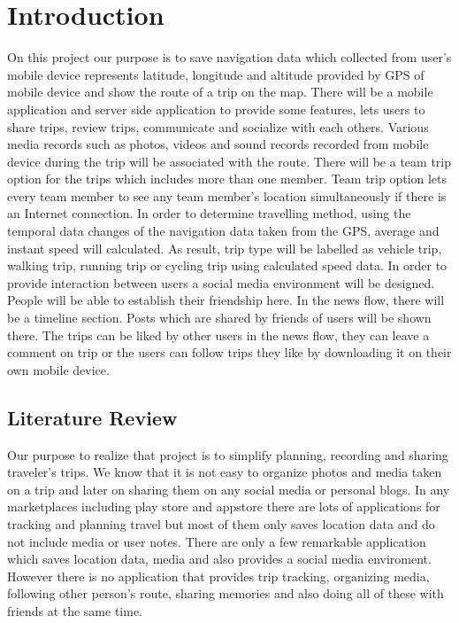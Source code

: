 \chapter{Introduction}
On this project our purpose is to save navigation data which collected from user's mobile device represents latitude, longitude and altitude provided by GPS of mobile device and show the route of a trip on the map. There will be a mobile application and server side application to provide some features, lets users to share trips, review trips, communicate and socialize with each others. Various media records such as photos, videos and sound records recorded from mobile device during the trip will be associated with the route. There will be a team trip option for the trips which includes more than one member. Team trip option lets every team member to see any team member's location simultaneously if there is an Internet connection. In order to determine travelling method, using the temporal data changes of the navigation data taken from the GPS, average and instant speed will calculated. As result, trip type will be labelled as vehicle trip, walking trip, running trip or cycling trip using calculated speed data. In order to provide interaction between users a social media environment will be designed. People will be able to establish their friendship here. In the news flow, there will be a timeline section. Posts which are shared by friends of users will be shown there. The trips can be liked by other users in the news flow, they can leave a comment on trip or the users can follow trips they like by downloading it on their own mobile device.
\section{Literature Review}
Our purpose to realize that project is to simplify planning, recording and sharing traveler's trips. We know that it is not easy to organize photos and media taken on a trip and later on sharing them on any social media or personal blogs. In any marketplaces including play store and appstore there are lots of applications for tracking and planning travel but most of them only saves location data and do not include media or user notes. There are only a few remarkable application which saves location data, media and also provides a social media enviroment. However there is no application that provides trip tracking, organizing media, following other person's route, sharing memories and also doing all of these with friends at the same time. 

